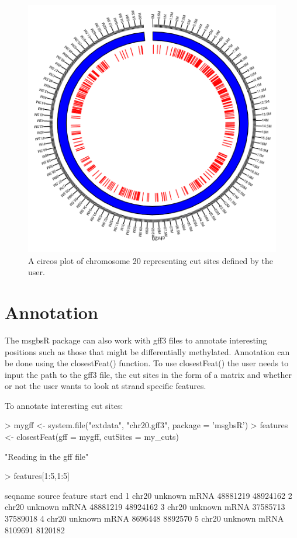\documentclass{article}
\begin{document}
\begin{figure}
\begin{center}
\includegraphics{msgbsR_Vignette-fig2}
\end{center}
\caption{A circos plot of chromosome 20 representing cut sites defined by the user.}
\label{fig:fig2}
\end{figure}

\clearpage

\section{Annotation}

The msgbsR package can also work with gff3 files to annotate interesting positions such as those that might be differentially methylated. Annotation can be done using the closestFeat() function. To use closestFeat() the user needs to input the path to the gff3 file, the cut sites in the form of a matrix and whether or not the user wants to look at strand specific features.

To annotate interesting cut sites:
\begin{Schunk}
\begin{Sinput}
> mygff <- system.file("extdata", "chr20.gff3", package = 'msgbsR')
> features <- closestFeat(gff = mygff, cutSites = my_cuts)
\end{Sinput}
\begin{Soutput}
[1] "Reading in the gff file"
\end{Soutput}
\begin{Sinput}
> features[1:5,1:5]
\end{Sinput}
\begin{Soutput}
  seqname  source feature    start      end
1   chr20 unknown    mRNA 48881219 48924162
2   chr20 unknown    mRNA 48881219 48924162
3   chr20 unknown    mRNA 37585713 37589018
4   chr20 unknown    mRNA  8696448  8892570
5   chr20 unknown    mRNA  8109691  8120182
\end{Soutput}
\end{Schunk}
\end{document}
